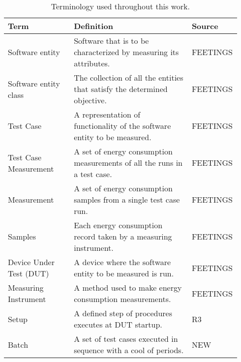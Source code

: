 
\begin{table}[ht]
    \begin{tabular}{| p{0.29\linewidth} | p{0.5\linewidth}| p{0.15\linewidth}|}
        \hline
        \textbf{Term}           & \textbf{Definition}                                                       & \textbf{Source} \\ \hline
        Software entity         & Software that is to be characterized by measuring its attributes.         & FEETINGS\cite{GarciaFEETINGS}        \\ \hline
        Software entity class   & The collection of all the entities that satisfy the determined objective. & FEETINGS\cite{GarciaFEETINGS}        \\ \hline
        Test Case               & A representation of functionality of the software entity to be measured.  & FEETINGS\cite{GarciaFEETINGS}         \\ \hline
        Test Case Measurement    & A set of energy consumption measurements of all the runs in a test case.  & FEETINGS\cite{GarciaFEETINGS}         \\ \hline
        Measurement             & A set of energy consumption samples from a single test case run.       & FEETINGS\cite{GarciaFEETINGS}         \\ \hline
        Samples                 & Each energy consumption record taken by a measuring instrument.           & FEETINGS\cite{GarciaFEETINGS}         \\ \hline
        Device Under Test (DUT) & A device where the software entity to be measured is run.                 & FEETINGS\cite{GarciaFEETINGS}         \\ \hline
        Measuring Instrument    & A method used to make energy consumption measurements.                    & FEETINGS\cite{GarciaFEETINGS}         \\ \hline
        Setup                   & A defined step of procedures executes at DUT startup.                     & R3\cite{Bokhari2020r3}              \\ \hline
        Batch                   & A set of test cases executed in sequence with a cool of periods.            & NEW             \\ \hline
    
    \end{tabular}
    \caption{Terminology used throughout this work.}
    \label{tab:TerminologyAlert}
    \end{table}